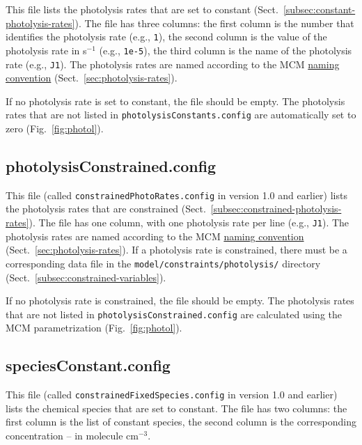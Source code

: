 This file lists the photolysis rates that are set to constant
(Sect.~\ref{subsec:constant-photolysis-rates}). The file has three
columns: the first column is the number that identifies the photolysis
rate (e.g., \texttt{1}), the second column is the value of the
photolysis rate in s$^{-1}$ (e.g., \texttt{1e-5}), the third column is
the name of the photolysis rate (e.g., \texttt{J1}). The photolysis
rates are named according to the MCM
\href{http://mcm.leeds.ac.uk/MCM/parameters/photolysis.htt}{naming convention}
(Sect.~\ref{sec:photolysis-rates}).

If no photolysis rate is set to constant, the file should be empty.
The photolysis rates that are not listed in \texttt{photolysisConstants.config}
are automatically set to zero (Fig.~\ref{fig:photol}).

\subsection{photolysisConstrained.config} \label{subsec:photolysisconstrained}

This file (called \texttt{constrainedPhotoRates.config} in version 1.0
and earlier) lists the photolysis rates that are constrained
(Sect.~\ref{subsec:constrained-photolysis-rates}). The file has one
column, with one photolysis rate per line (e.g., \texttt{J1}). The
photolysis rates are named according to the MCM
\href{http://mcm.leeds.ac.uk/MCM/parameters/photolysis.htt}{naming convention}
(Sect.~\ref{sec:photolysis-rates}). If a photolysis rate is
constrained, there must be a corresponding data file in the
\texttt{model/constraints/photolysis/} directory
(Sect.~\ref{subsec:constrained-variables}).

If no photolysis rate is constrained, the file should be empty. The
photolysis rates that are not listed in \texttt{photolysisConstrained.config}
are calculated using the MCM parametrization (Fig.~\ref{fig:photol}).

\subsection{speciesConstant.config} \label{subsec:speciesconstant}

This file (called \texttt{constrainedFixedSpecies.config} in version
1.0 and earlier) lists the chemical species that are set to
constant. The file has two columns: the first column is the list of
constant species, the second column is the corresponding concentration
-- in molecule cm$^{-3}$.

